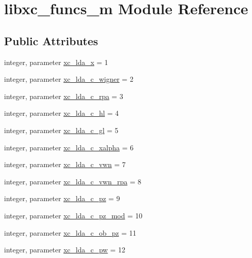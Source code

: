 \hypertarget{classlibxc__funcs__m}{\section{libxc\-\_\-funcs\-\_\-m Module Reference}
\label{classlibxc__funcs__m}
}
\subsection*{Public Attributes}
\begin{DoxyCompactItemize}
\item 
integer, parameter \hyperlink{classlibxc__funcs__m_a723c5b0b63dd205a54313c0df8f4af6f}{xc\-\_\-lda\-\_\-x} = 1
\item 
integer, parameter \hyperlink{classlibxc__funcs__m_a26eb01e72763cca4d5eee65c53bd9e9e}{xc\-\_\-lda\-\_\-c\-\_\-wigner} = 2
\item 
integer, parameter \hyperlink{classlibxc__funcs__m_a130acd39121a7d35adcf2fb1b613a59a}{xc\-\_\-lda\-\_\-c\-\_\-rpa} = 3
\item 
integer, parameter \hyperlink{classlibxc__funcs__m_a08c9e3f83851d8e0e25ef7ee758aa853}{xc\-\_\-lda\-\_\-c\-\_\-hl} = 4
\item 
integer, parameter \hyperlink{classlibxc__funcs__m_aafaa72ece19c0113cd8ec81b69f7f407}{xc\-\_\-lda\-\_\-c\-\_\-gl} = 5
\item 
integer, parameter \hyperlink{classlibxc__funcs__m_ae22157769465d6a370dad5d0b821f03e}{xc\-\_\-lda\-\_\-c\-\_\-xalpha} = 6
\item 
integer, parameter \hyperlink{classlibxc__funcs__m_aa183b6a1cb9dc5dca496ba5dce9422af}{xc\-\_\-lda\-\_\-c\-\_\-vwn} = 7
\item 
integer, parameter \hyperlink{classlibxc__funcs__m_a589ba64d751de2d2dc701200fffe9c9b}{xc\-\_\-lda\-\_\-c\-\_\-vwn\-\_\-rpa} = 8
\item 
integer, parameter \hyperlink{classlibxc__funcs__m_a1061294c1a161db03ee52a7d96ec2f02}{xc\-\_\-lda\-\_\-c\-\_\-pz} = 9
\item 
integer, parameter \hyperlink{classlibxc__funcs__m_a9cbc27489d9992cc903ea1c037d1a1c3}{xc\-\_\-lda\-\_\-c\-\_\-pz\-\_\-mod} = 10
\item 
integer, parameter \hyperlink{classlibxc__funcs__m_aaf322096b7bd8ccf9ec1dc90418d3a97}{xc\-\_\-lda\-\_\-c\-\_\-ob\-\_\-pz} = 11
\item 
integer, parameter \hyperlink{classlibxc__funcs__m_ae5f597a8e13edda4713e411142436818}{xc\-\_\-lda\-\_\-c\-\_\-pw} = 12

\end{DoxyCompactItemize}
